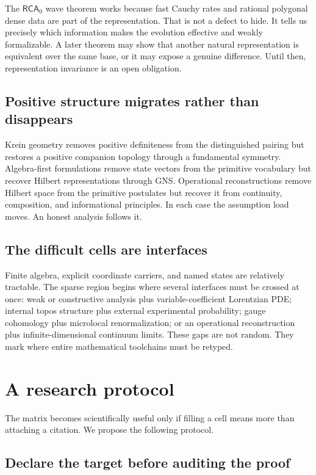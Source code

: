 \documentclass[11pt]{article}
\theoremstyle{definition}
\theoremstyle{remark}
\newcommand{\RCA}{\mathsf{RCA}_{0}}
\begin{document}
The \(\RCA\) wave theorem works because fast Cauchy rates and rational
polygonal dense data are part of the representation.  That is not a defect to
hide.  It tells us precisely which information makes the evolution effective
and weakly formalizable.  A later theorem may show that another natural
representation is equivalent over the same base, or it may expose a genuine
difference.  Until then, representation invariance is an open obligation.

\subsection{Positive structure migrates rather than disappears}

Krein geometry removes positive definiteness from the distinguished pairing
but restores a positive companion topology through a fundamental symmetry.
Algebra-first formulations remove state vectors from the primitive vocabulary
but recover Hilbert representations through GNS.  Operational
reconstructions remove Hilbert space from the primitive postulates but recover
it from continuity, composition, and informational principles.  In each case
the assumption load moves.  An honest analysis follows it.

\subsection{The difficult cells are interfaces}

Finite algebra, explicit coordinate carriers, and named states are relatively
tractable.  The sparse region begins where several interfaces must be crossed
at once: weak or constructive analysis plus variable-coefficient Lorentzian
PDE; internal topos structure plus external experimental probability; gauge
cohomology plus microlocal renormalization; or an operational reconstruction
plus infinite-dimensional continuum limits.  These gaps are not random.  They
mark where entire mathematical toolchains must be retyped.

\section{A research protocol}
\label{sec:protocol}

The matrix becomes scientifically useful only if filling a cell means more
than attaching a citation.  We propose the following protocol.

\subsection{Declare the target before auditing the proof}
\end{document}
